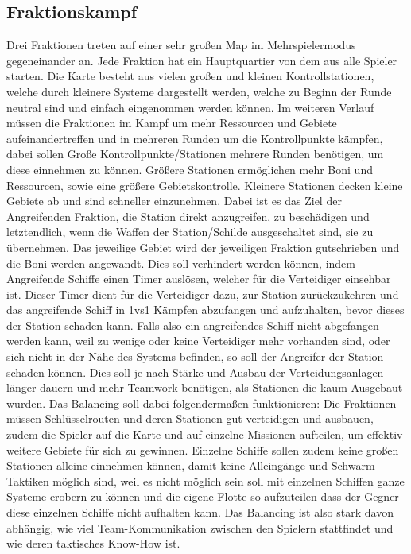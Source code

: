 \documentclass[fontsize=12pt,paper=a4,twoside]{scrartcl}
\begin{document}
\subsection{Fraktionskampf}
Drei Fraktionen treten auf einer sehr großen Map im Mehrspielermodus gegeneinander an. Jede Fraktion hat ein Hauptquartier von dem aus alle Spieler starten. Die Karte besteht aus vielen großen und kleinen Kontrollstationen, welche durch kleinere Systeme dargestellt werden, welche zu Beginn der Runde neutral sind und einfach eingenommen werden können. 
Im weiteren Verlauf müssen die Fraktionen im Kampf um mehr Ressourcen und Gebiete aufeinandertreffen und in mehreren Runden um die Kontrollpunkte kämpfen, dabei sollen Große Kontrollpunkte/Stationen mehrere Runden benötigen, um diese einnehmen zu können. Größere Stationen ermöglichen mehr Boni und Ressourcen, sowie eine größere Gebietskontrolle. Kleinere Stationen decken kleine Gebiete ab und sind schneller einzunehmen. Dabei ist es das Ziel der Angreifenden Fraktion, die Station direkt anzugreifen, zu beschädigen und letztendlich, wenn die Waffen der Station/Schilde ausgeschaltet sind, sie zu übernehmen. Das jeweilige Gebiet wird der jeweiligen Fraktion gutschrieben und die Boni werden angewandt. 
Dies soll verhindert werden können, indem Angreifende Schiffe einen Timer auslösen, welcher für die Verteidiger einsehbar ist. Dieser Timer dient für die Verteidiger dazu, zur Station zurückzukehren und das angreifende Schiff in 1vs1 Kämpfen abzufangen und aufzuhalten, bevor dieses der Station schaden kann.
 Falls also ein angreifendes Schiff nicht abgefangen werden kann, weil zu wenige oder keine Verteidiger mehr vorhanden sind, oder sich nicht in der Nähe des Systems befinden, so soll der Angreifer der Station schaden können. Dies soll je nach Stärke und Ausbau der Verteidungsanlagen länger dauern und mehr Teamwork benötigen, als Stationen die kaum Ausgebaut wurden.
 Das Balancing soll dabei folgendermaßen funktionieren: Die Fraktionen müssen Schlüsselrouten und deren Stationen gut verteidigen und ausbauen, zudem die Spieler auf die Karte und auf einzelne \glqq Missionen\grqq{} aufteilen, um effektiv weitere Gebiete für sich zu gewinnen. Einzelne Schiffe sollen zudem keine großen Stationen alleine einnehmen können, damit keine Alleingänge und \glqq Schwarm-Taktiken\grqq{} möglich sind, weil es nicht möglich sein soll mit einzelnen Schiffen ganze Systeme erobern zu können und die eigene Flotte so aufzuteilen dass der Gegner diese einzelnen Schiffe nicht aufhalten kann. 
 Das Balancing ist also stark davon abhängig, wie viel Team-Kommunikation zwischen den Spielern stattfindet und wie deren taktisches Know-How ist. 
\end{document}
